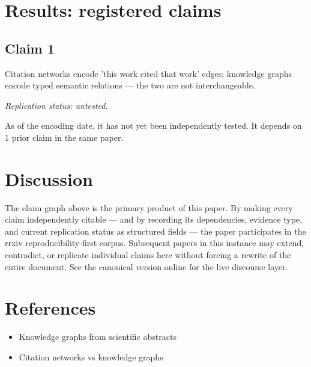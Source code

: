 \documentclass{rrxiv}
\begin{document}
\section{Results: registered claims}
\subsection*{Claim 1}
\begin{claim}[Claim 1]
\label{claim:c1}
Citation networks encode 'this work cited that work' edges; knowledge graphs encode typed semantic relations — the two are not interchangeable.

\emph{Replication status: untested.}
\end{claim}
As of the encoding date, it has not yet been independently tested. It depends on 1 prior claim in the same paper.

\section{Discussion}
The claim graph above is the primary product of this paper. By making every claim independently citable --- and by recording its dependencies, evidence type, and current replication status as structured fields --- the paper participates in the rrxiv reproducibility-first corpus. Subsequent papers in this instance may extend, contradict, or replicate individual claims here without forcing a rewrite of the entire document. See the canonical version online for the live discourse layer.

\section{References}
\begin{itemize}[leftmargin=*]
\item Knowledge graphs from scientific abstracts
\item Citation networks vs knowledge graphs
\end{itemize}
\end{document}
